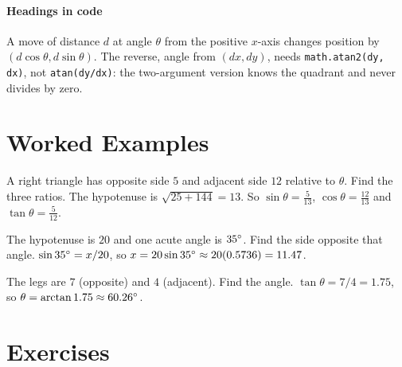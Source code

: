 \paragraph{Headings in code} A move of distance $d$ at angle $\theta$ from the positive $x$-axis changes position by $(d\cos\theta, d\sin\theta)$. The reverse, angle from $(dx, dy)$, needs \lstinline!math.atan2(dy, dx)!, not \lstinline!atan(dy/dx)!: the two-argument version knows the quadrant and never divides by zero.

\section{Worked Examples}

\begin{example}
A right triangle has opposite side $5$ and adjacent side $12$ relative to $\theta$. Find the three ratios.
\solution The hypotenuse is $\sqrt{25 + 144} = 13$. So $\sin\theta = \tfrac{5}{13}$, $\cos\theta = \tfrac{12}{13}$ and $\tan\theta = \tfrac{5}{12}$.
\end{example}

\begin{example}
The hypotenuse is $20$ and one acute angle is $35^\circ$. Find the side opposite that angle.
\solution $\sin 35^\circ = x/20$, so $x = 20\sin 35^\circ \approx 20(0.5736) = 11.47$.
\end{example}

\begin{example}
The legs are $7$ (opposite) and $4$ (adjacent). Find the angle.
\solution $\tan\theta = 7/4 = 1.75$, so $\theta = \arctan 1.75 \approx 60.26^\circ$.
\end{example}

\section{Exercises}

